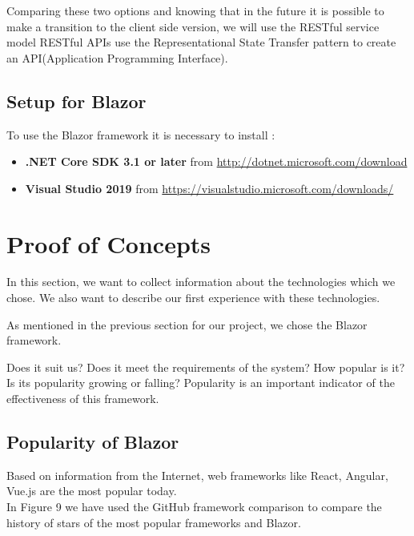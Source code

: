 \documentclass{scrartcl}
\begin{document}
Comparing these two options and knowing that in the future it is possible to make a transition to the client side version, we will use the RESTful service model
RESTful APIs use the Representational State Transfer pattern to create an API(Application Programming Interface). 

\subsection{Setup for Blazor}
To use the Blazor framework it is necessary to install :\\
\begin{itemize}
\item \textbf{.NET Core SDK 3.1 or later} from \url {http://dotnet.microsoft.com/download}
\item \textbf{Visual Studio 2019} from \url {https://visualstudio.microsoft.com/downloads/}
\end{itemize}

\section{Proof of Concepts }

In this section, we want to collect information about the technologies which we chose. We also want to describe our first experience with these technologies.

As mentioned in the previous section for our project, we chose the Blazor framework.

Does it suit us? Does it meet the requirements of the system?
How popular is it? Is its popularity growing or falling? Popularity is an important indicator of the effectiveness of this framework.\\
\subsection{Popularity of Blazor}
Based on information from the Internet, web frameworks like  React, Angular, Vue.js are the most popular today. \\


In Figure 9 we have used the GitHub framework comparison to compare the history of stars of the most popular frameworks and Blazor. \cite{starhistory}
\end{document}
